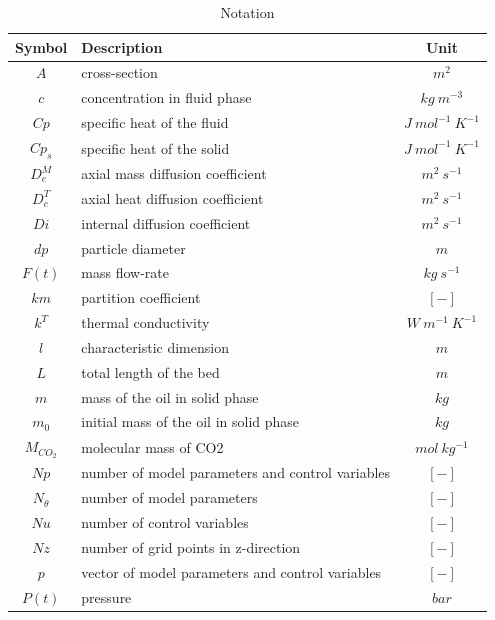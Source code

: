 \documentclass[a4paper,fleqn]{cas-dc}
\begin{document}
\iffalse
\newpage
\begin{table}[p]
		\caption{Notation}
		\label{tab::symbols}
		\begin{tabular}{ |c|l|c| } 
			\hline
			Symbol 		& 	Description 							& Unit 						\\ \hline
			$A$			&	cross-section							& $m^2$ 					\\ \hline
			$c$			&	concentration in fluid phase			& $kg ~ m^{-3}$				\\ \hline
			$Cp$		&	specific heat of the fluid				& $J ~ mol^{-1} ~ K^{-1}$ 	\\ \hline
			$Cp_s$		&	specific heat of the solid				& $J ~ mol^{-1} ~ K^{-1}$ 	\\ \hline
			$D_e^M$		&	axial mass diffusion coefficient		& $m^2 ~ s^{-1}$			\\ \hline
			$D_e^T$		&	axial heat diffusion coefficient		& $m^2 ~ s^{-1}$			\\ \hline
			$Di$		&	internal diffusion coefficient			& $m^2 ~ s^{-1}$			\\ \hline
			$dp$		&	particle diameter						& $m$						\\ \hline
			$F(t)$		&	mass flow-rate							& $kg ~ s^{-1}$				\\ \hline
			$km$		&	partition coefficient					& $[-]$						\\ \hline
			$k^T$		&	thermal conductivity					& $W ~ m^{-1} ~ K^{-1}$		\\ \hline
			$l$			&	characteristic dimension				& $m$						\\ \hline
			$L$			&	total length of the bed					& $m$						\\ \hline
			$m$			&	mass of the oil in solid phase			& $kg$						\\ \hline
			$m_0$		&	initial mass of the oil in solid phase	& $kg$						\\ \hline
			$M_{CO_2}$	&	molecular mass of CO2					& $mol ~ kg^{-1}$			\\ \hline
			$Np$		&	number of model parameters and control variables & $[-]$			\\ \hline
			$N_{\theta}$&	number of model parameters				& $[-]$						\\ \hline
			$Nu$		&	number of control variables				& $[-]$						\\ \hline
			$Nz$		&	number of grid points in z-direction	& $[-]$						\\ \hline
			$p$			&	vector of model parameters and control variables	& $[-]$			\\ \hline
			$P(t)$		&	pressure								& $bar$						\\ \hline

\end{tabular}
\end{table}
\end{document}
